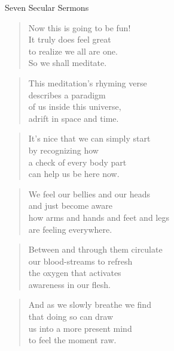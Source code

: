 \documentclass[14pt,a4paper]{article}
\begin{document}
\begin{titlepage}
    \centering
    {\huge Seven Secular Sermons\par} %
    \vspace{2.5cm}
    
\end{titlepage}

\twocolumn


\begin{verse}
Now this is going to be fun!\\
It truly does feel great\\
to realize we all are one.\\
So we shall meditate.
\end{verse}

\begin{verse}
This meditation’s rhyming verse\\
describes a paradigm\\
of us inside this universe,\\
adrift in space and time.
\end{verse}

\begin{verse}
It’s nice that we can simply start\\
by recognizing how\\
a check of every body part\\
can help us be here now.
\end{verse}

\begin{verse}
We feel our bellies and our heads\\
and just become aware\\
how arms and hands and feet and legs\\
are feeling everywhere.
\end{verse}

\begin{verse}
Between and through them circulate\\
our blood-streams to refresh\\
the oxygen that activates\\
awareness in our flesh.
\end{verse}

\begin{verse}
And as we slowly breathe we find\\
that doing so can draw\\
us into a more present mind\\
to feel the moment raw.
\end{verse}
\end{document}
